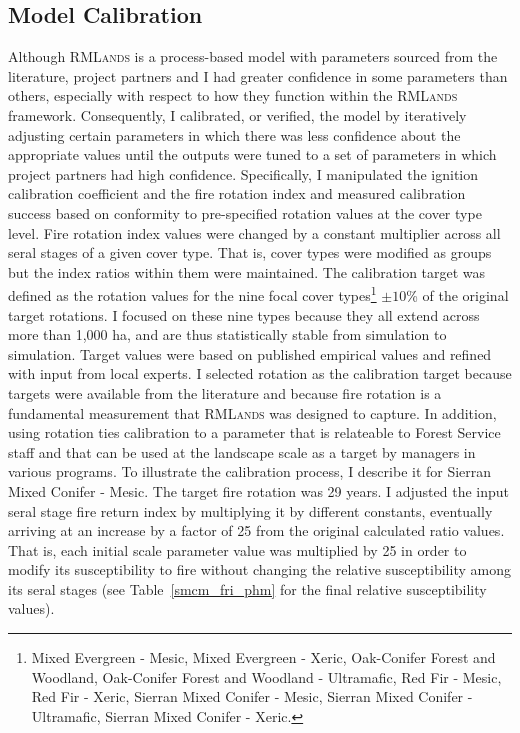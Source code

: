 \subsection{Model Calibration}
Although \textsc{RMLands} is a process-based model with parameters sourced from the literature, project partners and I had greater confidence in some parameters than others, especially with respect to how they function within the \textsc{RMLands} framework. Consequently, I calibrated, or verified, the model by iteratively adjusting certain parameters in which there was less confidence about the appropriate values until the outputs were tuned to a set of parameters in which project partners had high confidence. Specifically, I manipulated the ignition calibration coefficient and the fire rotation index and measured calibration success based on conformity to pre-specified rotation values at the cover type level. Fire rotation index values were changed by a constant multiplier across all seral stages of a given cover type. That is, cover types were modified as groups but the index ratios within them were maintained. The calibration target was defined as the rotation values for the nine focal cover types\footnote{Mixed Evergreen - Mesic, Mixed Evergreen - Xeric, Oak-Conifer Forest and Woodland, Oak-Conifer Forest and Woodland - Ultramafic, Red Fir - Mesic, Red Fir - Xeric, Sierran Mixed Conifer - Mesic, Sierran Mixed Conifer - Ultramafic, Sierran Mixed Conifer - Xeric.}  $\pm 10$\% of the original target rotations. I focused on these nine types because they all extend across more than 1,000 ha, and are thus statistically stable from simulation to simulation. Target values were based on published empirical values and refined with input from local experts. I selected rotation as the calibration target because targets were available from the literature and because fire rotation is a fundamental measurement that \textsc{RMLands} was designed to capture. In addition, using rotation ties calibration to a parameter that is relateable to Forest Service staff and that can be used at the landscape scale as a target by managers in various programs. To illustrate the calibration process, I describe it for Sierran Mixed Conifer - Mesic. The target fire rotation was 29 years. I adjusted the input seral stage fire return index by multiplying it by different constants, eventually arriving at an increase by a factor of 25 from the original calculated ratio values. That is, each initial scale parameter value was multiplied by 25 in order to modify its susceptibility to fire without changing the relative susceptibility among its seral stages (see Table~\ref{smcm_fri_phm} for the final relative susceptibility values). 


